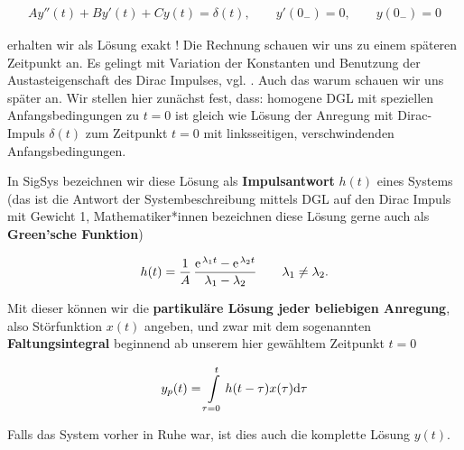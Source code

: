 \begin{mdframed}[backgroundcolor=C3!10]
\begin{align}
A y''(t) + B y'(t) + C y(t) = \delta(t),\qquad y'(0_-) = 0,\qquad y(0_-) = 0
\end{align}
\end{mdframed}
erhalten wir als Lösung exakt !
%
Die Rechnung schauen wir uns zu einem späteren Zeitpunkt an. Es gelingt mit Variation
der Konstanten und Benutzung der Austasteigenschaft des Dirac Impulses,
vgl. \cite[S.133ff]{Strang2014}.
%
Auch das warum schauen wir uns später an. Wir stellen hier zunächst fest, dass:
homogene DGL mit speziellen Anfangsbedingungen zu $t=0$ ist gleich wie
Lösung der Anregung mit Dirac-Impuls $\delta(t)$ zum Zeitpunkt $t=0$ mit
linksseitigen, verschwindenden Anfangsbedingungen.

In SigSys bezeichnen wir diese Lösung als \textbf{Impulsantwort} $h(t)$
eines Systems (das ist die Antwort der Systembeschreibung mittels DGL auf den
Dirac Impuls mit Gewicht 1, Mathematiker*innen
bezeichnen diese Lösung gerne auch als \textbf{Green'sche Funktion})
\begin{mdframed}[backgroundcolor=C3!10]
\begin{align}
h(t) =
\frac{1}{A}\,\frac{\e^{\lambda_1 t} - \e^{\lambda_2 t}}{\lambda_1 - \lambda_2}
\qquad \lambda_1 \neq \lambda_2.
\end{align}
\end{mdframed}

Mit dieser können wir die \textbf{partikuläre Lösung jeder beliebigen Anregung},
also Störfunktion $x(t)$ angeben, und zwar mit dem sogenannten
\textbf{Faltungsintegral} beginnend ab unserem hier gewähltem
Zeitpunkt $t=0$
%
\begin{mdframed}[backgroundcolor=C3!10]
\begin{equation}
y_p(t) = \int\limits_{\tau=0}^{t} h(t-\tau) x(\tau) \mathrm{d} \tau
\end{equation}
\end{mdframed}
%
Falls das System vorher in Ruhe war, ist dies auch die komplette Lösung $y(t)$.
%

